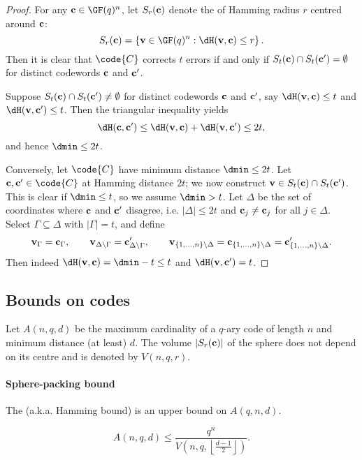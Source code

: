 \documentclass[a4paper, 11pt, openany]{book}
\begin{document}
\begin{proof}
For any ${\bf c} \in \GF(q)^n$, let $S_r({\bf c})$ denote the  of Hamming radius $r$ centred around ${\bf c}$:
\[
    S_r({\bf c}) = \left\{ {\bf v} \in \GF(q)^n : \dH({\bf v}, {\bf c}) \le r  \right\}.
\]
Then it is clear that $\code{C}$ corrects $t$ errors if and only if $S_t({\bf c}) \cap S_t({\bf c}') = \emptyset$ for distinct codewords ${\bf c}$ and ${\bf c}'$.

Suppose $S_t({\bf c}) \cap S_t({\bf c}') \ne \emptyset$ for distinct codewords ${\bf c}$ and ${\bf c}'$, say $\dH({\bf v}, {\bf c}) \le t$ and $\dH({\bf v}, {\bf c}') \le t$. Then the triangular inequality yields
\[
    \dH({\bf c}, {\bf c}') \le \dH({\bf v}, {\bf c}) + \dH({\bf v}, {\bf c}') \le 2t,
\]
and hence $\dmin \le 2t$.

Conversely, let $\code{C}$ have minimum distance $\dmin \le 2t$. Let ${\bf c}, {\bf c}' \in \code{C}$ at Hamming distance $2t$; we now construct ${\bf v} \in S_t({\bf c}) \cap S_t({\bf c}')$. This is clear if $\dmin \le t$, so we assume $\dmin > t$. Let $\Delta$ be the set of coordinates where ${\bf c}$ and ${\bf c}'$ disagree, i.e. $|\Delta| \le 2t$ and ${\bf c}_j \ne {\bf c}_j$ for all $j \in \Delta$. Select $\Gamma \subseteq \Delta$ with $|\Gamma| = t$, and define
\[
    {\bf v}_\Gamma = {\bf c}_\Gamma, \qquad
    {\bf v}_{\Delta \setminus \Gamma} = {\bf c}'_{\Delta \setminus \Gamma}, \qquad
    {\bf v}_{\{1, \dots, n\} \setminus \Delta} = {\bf c}_{\{1, \dots, n\} \setminus \Delta} = {\bf c}'_{\{1, \dots, n\} \setminus \Delta}.
\]
Then indeed $\dH({\bf v}, {\bf c}) = \dmin  - t \le t$ and $\dH({\bf v}, {\bf c}') = t$.
\end{proof}


\subsection{Bounds on codes}


Let $A(n,q,d)$ be the maximum cardinality of a $q$-ary code of length $n$ and minimum distance (at least) $d$.
The volume $|S_r({\bf c})|$ of the sphere does not depend on its centre and is denoted by
$V(n,q,r)$.

\paragraph{Sphere-packing bound}
The  (a.k.a. Hamming bound) is an upper bound on $A(q,n,d)$.


\begin{theorem}
\[
	A(n,q,d) \le \frac{ q^n }{ V \left( n,q, \left\lfloor \frac{d-1}{2} \right\rfloor \right) } .
\]
\end{theorem}
\end{document}
